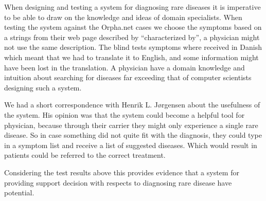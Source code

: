 When designing and testing a system for diagnosing rare diseases it is
imperative to be able to draw on the knowledge and ideas of domain
specialists. When testing the system against the Orpha.net cases we
choose the symptoms based on a strings from their web page described
by ``characterized by'', a physician might not use the same
description. The blind tests symptoms where received in Danish which
meant that we had to translate it to English, and some information
might have been lost in the translation. A physician have a domain
knowledge and intuition about searching for diseases far exceeding
that of computer scientists designing such a system.

We had a short correspondence with Henrik L. J\o rgensen about the
usefulness of the system. His opinion was that the system could become a
helpful tool for physician, because through their carrier they might
only experience a single rare disease. So in case something did not
quite fit with the diagnosis, they could type in a symptom list and
receive a list of suggested diseases. Which would result in patients
could be referred to the correct treatment.

Considering the test results above this provides evidence that a
system for providing support decision with respects to diagnosing rare
disease have potential.
